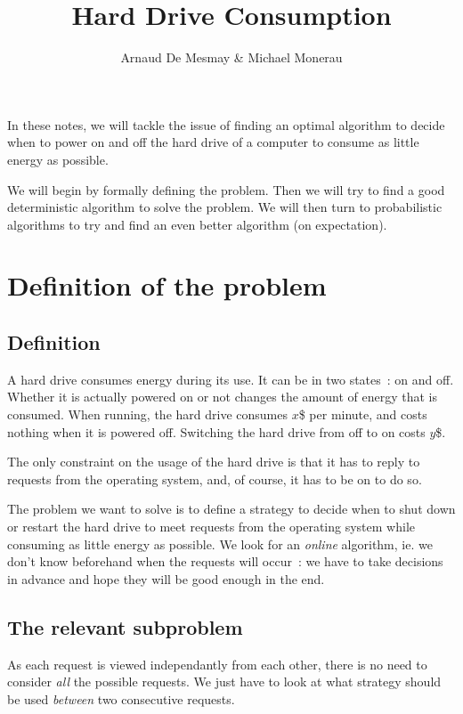 \documentclass[a4paper,11pt]{article}
\title{Hard Drive Consumption}
\author{Arnaud De Mesmay \& Michael Monerau}
\begin{document}
\maketitle

In these notes, we will tackle the issue of finding an optimal algorithm to decide when to power on and off the hard drive of a computer to consume as little energy as possible.

We will begin by formally defining the problem. Then we will try to find a good deterministic algorithm to solve the problem. We will then turn to probabilistic algorithms to try and find an even better algorithm (on expectation).

\section{Definition of the problem}

\subsection{Definition}

A hard drive consumes energy during its use. It can be in two states~: on and off. Whether it is actually powered on or not changes the amount of energy that is consumed. When running, the hard drive consumes $x$\$ per minute, and costs nothing when it is powered off. Switching the hard drive from off to on costs $y$\$.

The only constraint on the usage of the hard drive is that it has to reply to requests from the operating system, and, of course, it has to be on to do so.

The problem we want to solve is to define a strategy to decide when to shut down or restart the hard drive to meet requests from the operating system while consuming as little energy as possible. We look for an \emph{online} algorithm, ie. we don't know beforehand when the requests will occur~: we have to take decisions in advance and hope they will be good enough in the end.

\subsection{The relevant subproblem}

As each request is viewed independantly from each other, there is no need to consider \emph{all} the possible requests. We just have to look at what strategy should be used \emph{between} two consecutive requests.
\end{document}
